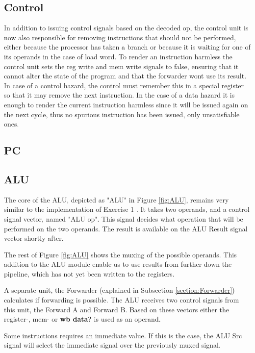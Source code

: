 \subsection{Control}
In addition to issuing control signals based on the decoded op, the control unit is now also responsible for removing instructions that should not be performed, either because the processor has taken a branch or because it is waiting for one of its operands in the case of load word.
To render an instruction harmless the control unit sets the reg write and mem write signals to false, ensuring that it cannot alter the state of the program and that the forwarder wont use its result.
In case of a control hazard, the control must remember this in a special register so that it may remove the next instruction. 
In the case of a data hazard it is enough to render the current instruction harmless since it will be issued again on the next cycle, thus no spurious instruction has been issued, only unsatisfiable ones.


\subsection{PC}

\subsection{ALU}
The core of the ALU, depicted as "ALU" in Figure \ref{fig:ALU}, remains very similar to the implementation of Exercise 1 \cite{ex1report}. It takes two operands, and a control signal vector, named "ALU op". This signal decides what operation that will be performed on the two operands. The result is available on the ALU Result signal vector shortly after.

The rest of Figure \ref{fig:ALU} shows the muxing of the possible operands. This addition to the ALU module enable us to use results from further down the pipeline, which has not yet been written to the registers.

A separate unit, the Forwarder (explained in Subsection \ref{section:Forwarder}) calculates if forwarding is possible. The ALU receives two control signals from this unit, the Forward A and Forward B.
Based on these vectors either the register-, mem- or \textbf{wb data?} is used as an operand.

Some instructions requires an immediate value. If this is the case, the ALU Src signal will select the immediate signal over the previously muxed signal.

